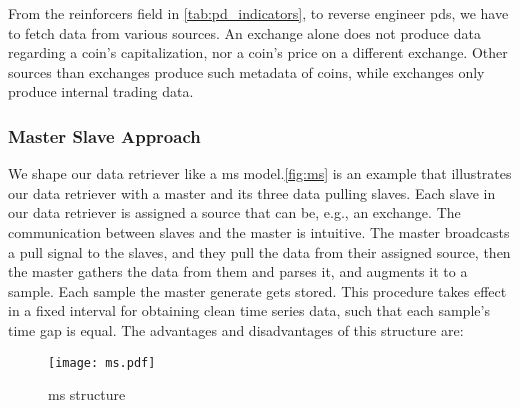 From the reinforcers field in \autoref{tab:pd_indicators}, to reverse engineer \acp{pd}, we have to fetch data from various sources. An exchange alone does not produce data regarding a coin's capitalization, nor a coin's price on a different exchange. Other sources than exchanges produce such metadata of coins, while exchanges only produce internal trading data.

\subsubsection{Master Slave Approach}
We shape our data retriever like a \ac{ms} model.\autoref{fig:ms} is an example that illustrates our data retriever with a master and its three data pulling slaves. Each slave in our data retriever is assigned a source that can be, e.g., an exchange. The communication between slaves and the master is intuitive. The master broadcasts a pull signal to the slaves, and they pull the data from their assigned source, then the master gathers the data from them and parses it, and augments it to a sample. Each sample the master generate gets stored. This procedure takes effect in a fixed interval for obtaining clean time series data, such that each sample's time gap is equal. The advantages and disadvantages of this structure are:

\begin{figure}[ht]
    \centering
    \texttt{[image: ms.pdf]}
    \caption{\acf{ms} structure}
    \label{fig:ms}
\end{figure}



